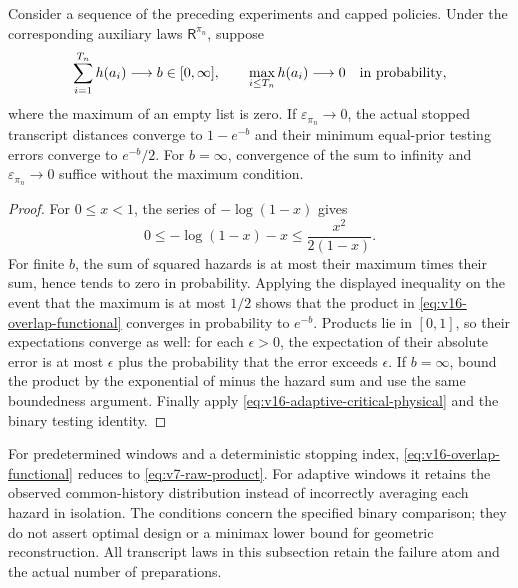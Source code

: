 \begin{corollary}
\label{cor:v16-adaptive-critical-limit}
Consider a sequence of the preceding experiments and capped policies.
Under the corresponding auxiliary laws $\mathsf R^{\pi_n}$, suppose
\begin{equation}\label{eq:v16-adaptive-hazard-limit}
 \sum_{i=1}^{T_n}h(a_i)\longrightarrow b\in[0,\infty],\qquad
 \max_{i\le T_n}h(a_i)\longrightarrow0
 \quad\hbox{in probability},
\end{equation}
where the maximum of an empty list is zero. If
$\varepsilon_{\pi_n}\to0$, the actual stopped transcript distances
converge to $1-e^{-b}$ and their minimum equal-prior testing errors
converge to $e^{-b}/2$. For $b=\infty$, convergence of the sum to
infinity and $\varepsilon_{\pi_n}\to0$ suffice without the maximum
condition.
\end{corollary}
\begin{proof}
For $0\le x<1$, the series of $-\log(1-x)$ gives
\[
 0\le-\log(1-x)-x\le\frac{x^2}{2(1-x)}.
\]
For finite $b$, the sum of squared hazards is at most their maximum
times their sum, hence tends to zero in probability. Applying the
displayed inequality on the event that the maximum is at most $1/2$
shows that the product in \eqref{eq:v16-overlap-functional} converges
in probability to $e^{-b}$. Products lie in $[0,1]$, so their
expectations converge as well: for each $\epsilon>0$, the expectation
of their absolute error is at most $\epsilon$ plus the probability
that the error exceeds $\epsilon$. If $b=\infty$, bound the product
by the exponential of minus the hazard sum and use the same boundedness
argument. Finally apply \eqref{eq:v16-adaptive-critical-physical} and
the binary testing identity.
\end{proof}

For predetermined windows and a deterministic stopping index,
\eqref{eq:v16-overlap-functional} reduces to
\eqref{eq:v7-raw-product}. For adaptive windows it retains the observed
common-history distribution instead of incorrectly averaging each hazard
in isolation. The conditions concern the specified binary comparison;
they do not assert optimal design or a minimax lower bound for geometric
reconstruction. All transcript laws in this subsection retain the failure
atom and the actual number of preparations.
